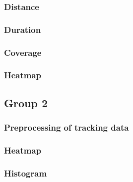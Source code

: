 \documentclass[twoside]{article}
\begin{document}
\subsubsection{Distance} %
\subsubsection{Duration} %
\subsubsection{Coverage} %
\subsubsection{Heatmap} %

\subsection{Group 2} %
\subsubsection{Preprocessing of tracking data}
\subsubsection{Heatmap}
\subsubsection{Histogram}

\end{document}

